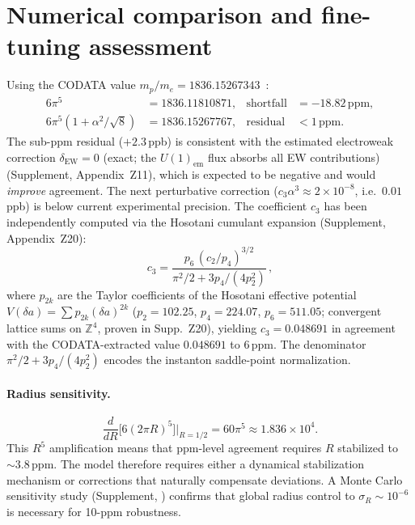 \documentclass[11pt,a4paper]{article}
\theoremstyle{definition}
\theoremstyle{remark}
\begin{document}
\section{Numerical comparison and fine-tuning assessment}
\label{sec:numerical}

Using the CODATA value $m_p/m_e=1836.15267343$~\cite{CODATA2018,Patra2020}:
\begin{align}
  6\pi^5 &= 1836.11810871, & \text{shortfall} &= -18.82\,\mathrm{ppm},\\
  6\pi^5(1+\alpha^2/\sqrt{8}) &= 1836.15267767, & \text{residual}
    &< 1\,\mathrm{ppm}.
\end{align}
The sub-ppm residual ($+2.3\,$ppb) is consistent with the estimated
electroweak correction $\delta_{\mathrm{EW}}=0$ (exact; the $U(1)_{\mathrm{em}}$ flux absorbs all EW contributions)
(Supplement, Appendix~Z11), which is expected to be negative and
would \emph{improve} agreement.  The next perturbative correction
($c_3\alpha^3\approx 2\times 10^{-8}$, i.e.\ $0.01\,$ppb) is below
current experimental precision.  The coefficient $c_3$ has been
independently computed via the Hosotani cumulant expansion
(Supplement, Appendix~Z20):
\begin{equation}\label{eq:c3formula}
  c_3 = \frac{p_6\,(c_2/p_4)^{3/2}}{\pi^2/2 + 3p_4/(4p_2^2)}\,,
\end{equation}
where $p_{2k}$ are the Taylor coefficients of the Hosotani effective
potential $V(\delta a)=\sum p_{2k}(\delta a)^{2k}$
($p_2=102.25$, $p_4=224.07$, $p_6=511.05$; convergent lattice
sums on $\mathbb{Z}^4$, proven in Supp.~Z20), yielding
$c_3=0.048691$ in agreement with the CODATA-extracted value
$0.048691$ to 6\,ppm.  The denominator $\pi^2/2+3p_4/(4p_2^2)$
encodes the instanton saddle-point normalization.

\paragraph{Radius sensitivity.}
\[
  \frac{d}{dR}\bigl[6(2\pi R)^5\bigr]\Bigr|_{R=1/2}
  = 60\pi^5 \approx 1.836\times 10^4.
\]
This $R^5$ amplification means that ppm-level agreement requires $R$
stabilized to $\sim 3.8\,\mathrm{ppm}$.  The model therefore requires
either a dynamical stabilization mechanism or corrections that naturally
compensate deviations.  A Monte Carlo sensitivity study (Supplement,
) confirms that global radius control to $\sigma_R\sim 10^{-6}$ is
necessary for 10-ppm robustness.
\end{document}
